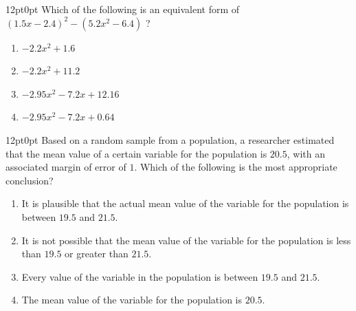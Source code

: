 \documentclass[11pt, twocolumn]{article}
\newcounter{questionnum}
\begin{document}
\vspace{6pt}\noindent
\begin{minipage}{\columnwidth}\raggedright
\noindent{}\par\vspace{8pt}
\begin{adjustwidth}{12pt}{0pt}
Which of the following is an equivalent form of $(1 . 5 x - 2 . 4 )^{2} - (5 . 2 x^{2} - 6 . 4 )$ ?
\begin{enumerate}[label=\Alph*),leftmargin=18pt,topsep=3pt,itemsep=2pt]
  \item $-2 . 2 x^{2} + 1 . 6$
  \item $-2 . 2 x^{2} + 11 . 2$
  \item $-2 . 95 x^{2} - 7 . 2 x + 12 . 16$
  \item $-2 . 95 x^{2} - 7 . 2 x + 0 . 64$
\end{enumerate}
\end{adjustwidth}
\end{minipage}\par

\vspace{6pt}\noindent
\begin{minipage}{\columnwidth}\raggedright
\noindent{}\par\vspace{8pt}
\begin{adjustwidth}{12pt}{0pt}
Based on a random sample from a population, a researcher estimated that the mean value of a certain variable for the population is $20.5$, with an associated margin of error of $1$. Which of the following is the most appropriate conclusion?
\begin{enumerate}[label=\Alph*),leftmargin=18pt,topsep=3pt,itemsep=2pt]
  \item It is plausible that the actual mean value of the variable for the population is between $19.5$ and $21.5$.
  \item It is not possible that the mean value of the variable for the population is less than $19.5$ or greater than $21.5$.
  \item Every value of the variable in the population is between $19.5$ and $21.5$.
  \item The mean value of the variable for the population is $20.5$.
\end{enumerate}
\end{adjustwidth}
\end{minipage}\par
\end{document}
